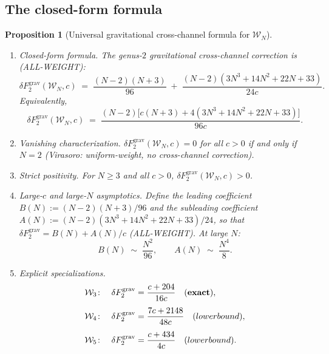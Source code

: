 \documentclass[11pt]{article}
\newtheorem{proposition}[theorem]{Proposition}
\theoremstyle{definition}
\theoremstyle{remark}
\newcommand{\Walg}{\mathcal{W}}
\newcommand{\grav}{\mathrm{grav}}
\numberwithin{equation}{section}
\begin{document}
\subsection{The closed-form formula}

\begin{proposition}[Universal gravitational cross-channel formula for
$\Walg_N$]\label{prop:universal-N-formula}
\begin{enumerate}[label=\textup{(\roman*)}]
\item \emph{Closed-form formula.}
 The genus-$2$ gravitational cross-channel correction is
 \textup{(ALL-WEIGHT)}:
 \begin{equation}\label{eq:universal-N-formula}
 \boxed{
 \delta F_2^{\grav}(\Walg_N, c)
 \;=\;
 \frac{(N{-}2)(N{+}3)}{96}
 \;+\;
 \frac{(N{-}2)(3N^3 + 14N^2 + 22N + 33)}{24c}.
 }
 \end{equation}
 Equivalently,
 \begin{equation}\label{eq:universal-N-formula-combined}
 \delta F_2^{\grav}(\Walg_N, c)
 \;=\;
 \frac{(N{-}2)\bigl[c(N{+}3)
 + 4(3N^3 + 14N^2 + 22N + 33)\bigr]}{96c}.
 \end{equation}

\item \emph{Vanishing characterization.}
 $\delta F_2^{\grav}(\Walg_N, c) = 0$ for all $c > 0$
 if and only if $N = 2$
 \textup{(}Virasoro: uniform-weight, no cross-channel
 correction\textup{)}.

\item \emph{Strict positivity.}
 For $N \geq 3$ and all $c > 0$,
 $\delta F_2^{\grav}(\Walg_N, c) > 0$.

\item \emph{Large-$c$ and large-$N$ asymptotics.}
 Define the leading coefficient
 $B(N) := (N{-}2)(N{+}3)/96$
 and the subleading coefficient
 $A(N) := (N{-}2)(3N^3 + 14N^2 + 22N + 33)/24$,
 so that
 $\delta F_2^{\grav} = B(N) + A(N)/c$
 \textup{(ALL-WEIGHT)}.
 At large $N$:
 \[
 B(N) \;\sim\; \frac{N^2}{96}, \qquad
 A(N) \;\sim\; \frac{N^4}{8}.
 \]

\item \emph{Explicit specializations.}
 \begin{align}
 \Walg_3\colon\quad
 \delta F_2^{\grav}
 &= \frac{c + 204}{16c}
 \quad\textup{(}\textbf{exact}\textup{)},
 \label{eq:grav-cross-W3-explicit}\\[4pt]
 \Walg_4\colon\quad
 \delta F_2^{\grav}
 &= \frac{7c + 2148}{48c}
 \quad\textup{(}lower bound\textup{)},
 \label{eq:grav-cross-W4-explicit}\\[4pt]
 \Walg_5\colon\quad
 \delta F_2^{\grav}
 &= \frac{c + 434}{4c}
 \quad\textup{(}lower bound\textup{)}.
 \label{eq:grav-cross-W5-explicit}
 \end{align}


\end{enumerate}
\end{proposition}
\end{document}
